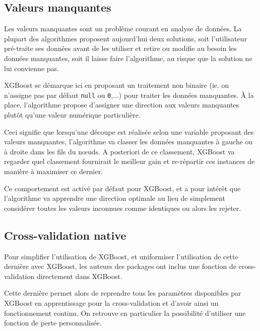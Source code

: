 \subsection{Valeurs manquantes}
Les valeurs manquantes sont un problème courant en analyse de données. La plupart des algorithmes proposent aujourd'hui deux solutions, soit l'utilisateur pré-traite ses données avant de les utiliser et retire ou modifie au besoin les données manquantes, soit il \og laisse faire\fg{} l'algorithme, au risque que la solution ne lui convienne pas.

XGBoost se démarque ici en proposant un traitement non binaire (ie. on n'assigne pas par défaut \texttt{null} ou \texttt{0},...) pour traiter les données manquantes. À la place, l'algorithme propose d'assigner une direction aux valeurs manquantes plutôt qu'une valeur numérique particulière.

Ceci signifie que lorsqu'une découpe est réalisée selon une variable proposant des valeurs manquantes, l'algorithme va classer les données manquantes \og à gauche ou à droite\fg{} dans les fils du n\oe uds. A posteriori de ce classement, XGBoost va regarder quel classement fournirait le meilleur gain et re-répartir ces instances de manière à maximiser ce dernier.

Ce comportement est activé par défaut pour XGBoost, et a pour intérêt que l'algorithme va apprendre une direction optimale au lieu de simplement considérer toutes les valeurs inconnues comme identiques ou alors les rejeter.
\subsection{Cross-validation native}
Pour simplifier l'utilisation de XGBoost, et uniformiser l'utilisation de cette dernière avec XGBoost, les auteurs des packages ont inclus une fonction de cross-validation directement dans XGBoost.

Cette dernière permet alors de reprendre tous les paramètres disponibles par XGBoost en apprentissage pour la cross-validation et d'avoir ainsi un fonctionnement continu. On retrouve en particulier la possibilité d'utiliser une fonction de perte personnalisée.
